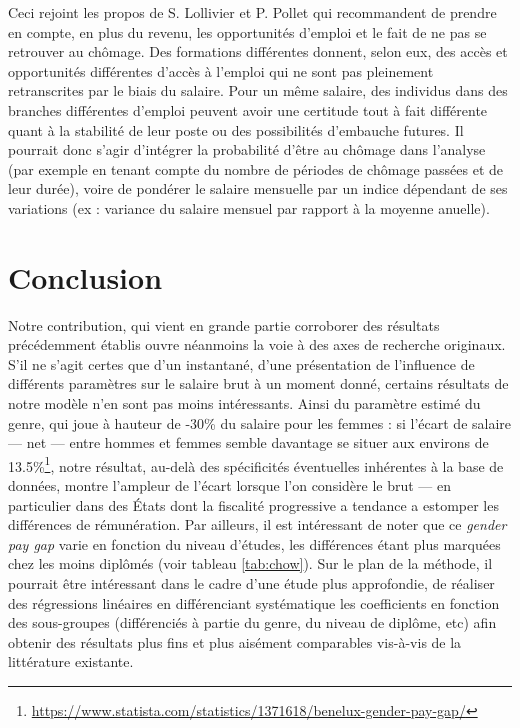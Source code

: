 \documentclass[a4paper, french, 11 pt]{article}\usepackage[]{graphicx}\usepackage[]{xcolor}
\begin{document}
Ceci rejoint les propos de S. Lollivier et P. Pollet qui recommandent de prendre en compte, en plus du revenu, les opportunités d’emploi et le fait de ne pas se retrouver au chômage. Des formations différentes donnent, selon eux, des accès et opportunités différentes d’accès à l’emploi qui ne sont pas pleinement retranscrites par le biais du salaire. Pour un même salaire, des individus dans des branches différentes d’emploi peuvent avoir une certitude tout à fait différente quant à la stabilité de leur poste ou des possibilités d’embauche futures. Il pourrait donc s'agir d'intégrer la probabilité d'être au chômage dans l'analyse (par exemple en tenant compte du nombre de périodes de chômage passées et de leur durée), voire de pondérer le salaire mensuelle par un indice dépendant de ses variations (ex : variance du salaire mensuel par rapport à la moyenne anuelle). 

\section*{Conclusion}
         
         Notre contribution, qui vient en grande partie corroborer des résultats précédemment établis ouvre néanmoins la voie à des axes de recherche originaux. S'il ne s'agit certes que d'un instantané, d'une présentation de l'influence de différents paramètres sur le salaire brut à un moment donné, certains résultats de notre modèle n'en sont pas moins intéressants. Ainsi du paramètre estimé du genre, qui joue à hauteur de -30\% du salaire pour les femmes : si l'écart de salaire --- net --- entre hommes et femmes semble davantage se situer aux environs de 13.5\%\footnote{\url{https://www.statista.com/statistics/1371618/benelux-gender-pay-gap/}}, notre résultat, au-delà des spécificités éventuelles inhérentes à la base de données, montre l'ampleur de l'écart lorsque l'on considère le brut --- en particulier dans des États dont la fiscalité progressive a tendance a estomper les différences de rémunération. Par ailleurs, il est intéressant de noter que ce \textit{gender pay gap} varie en fonction du niveau d'études, les différences étant plus marquées chez les moins diplômés (voir tableau \ref{tab:chow}). Sur le plan de la méthode, il pourrait être intéressant dans le cadre d'une étude plus approfondie, de réaliser des régressions linéaires en différenciant systématique les coefficients en fonction des sous-groupes (différenciés à partie du genre, du niveau de diplôme, etc) afin obtenir des résultats plus fins et plus aisément comparables vis-à-vis de la littérature existante. 
\end{document}
